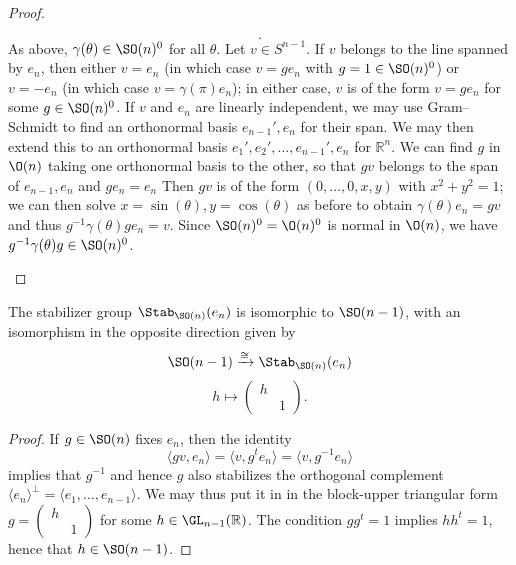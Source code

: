 \documentclass[reqno]{amsart} 
\begin{document}
\begin{proof}
\begin{enumerate}
\begin{equation*}
.
    \end{equation*}
    As above, $\gamma(\theta) \in \SO(n)^0$ for all $\theta$.
    Let $v \in S^{n-1}$.  If $v$ belongs to the line spanned by
    $e_n$, then either $v = e_n$ (in which case $v = g e_n$ with
    $g = 1 \in \SO(n)^0$) or $v = - e_n$ (in which case
    $v = \gamma(\pi) e_n$); in either case, $v$ is of the form
    $v = g e_n$ for some $g \in \SO(n)^0$.  If $v$ and $e_n$ are
    linearly independent, we may use Gram--Schmidt to find an
    orthonormal basis $e_{n-1}', e_n$ for their span.  We may
    then extend this to an orthonormal basis
    $e_1', e_2', \dotsc, e_{n-1}', e_n$ for $\mathbb{R}^n$.
    We can find $g$ in $\O(n)$ taking one orthonormal basis
    to the other,
    so that $g v$ belongs to the span of
    $e_{n-1}, e_n$
    and $g e_n = e_n$
    Then $g v$ is of the form $(0,\dotsc,0,x,y)$
    with $x^2 + y^2 = 1$; we can then solve
    $x = \sin(\theta), y = \cos(\theta)$ as before to obtain
    $\gamma(\theta) e_n = g v$
    and thus
    $g^{-1} \gamma(\theta) g e_n = v$.
    Since $\SO(n)^0 = \O(n)^0$ is normal in $\O(n)$,
    we have $g^{-1} \gamma(\theta) g \in \SO(n)^0$.
  \end{enumerate}
\end{proof}
\begin{lemma}\label{lem:compute-stabilizer-north-pole-so-n}
  The stabilizer group
  $\Stab_{\SO(n)}(e_n)$
  is isomorphic to $\SO(n-1)$,
  with an isomorphism in the opposite direction
  given by
  \begin{equation*}
  \SO(n-1) \xrightarrow{\cong} \Stab_{\SO(n)}(e_n)
  \end{equation*}
  \begin{equation*}
  h \mapsto 
\begin{pmatrix}
    h &  \\
    & 1
  \end{pmatrix}
.
  \end{equation*}
\end{lemma}
\begin{proof}
  If $g \in \SO(n)$ fixes $e_n$,
  then
  the identity
  \begin{equation*}
  \langle g v, e_n \rangle = \langle v, g^t e_n \rangle
  = 
  \langle v, g^{-1} e_n \rangle
  \end{equation*}
  implies that $g^{-1}$ and hence $g$ also stabilizes
  the orthogonal complement $\langle e_n \rangle^\perp = \langle
  e_1,\dotsc,e_{n-1} \rangle$.
  We may thus put it in in the block-upper triangular
  form
  $g = 
\begin{pmatrix}
    h &  \\
    & 1
  \end{pmatrix}
$ for some $h \in \GL_{n-1}(\mathbb{R})$.
  The condition $g g^t = 1$ implies $h h^t = 1$,
  hence that $h \in \SO(n-1)$.
\end{proof}
\end{document}
